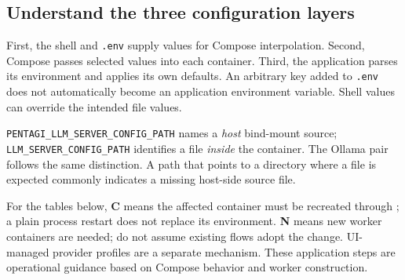 \documentclass[11pt,letterpaper]{article}
\newcommand{\code}[1]{\nolinkurl{#1}}
\newcommand{\src}[1]{\cite{#1}}
\begin{document}
\subsection{Understand the three configuration layers}
First, the shell and \code{.env} supply values for Compose interpolation.
Second, Compose passes selected values into each container. Third, the
application parses its environment and applies its own defaults. An arbitrary
key added to \code{.env} does not automatically become an application
environment variable. Shell values can override the intended file values.
\src{interpolation,precedence}

\code{PENTAGI_LLM_SERVER_CONFIG_PATH} names a \emph{host} bind-mount source;
\code{LLM_SERVER_CONFIG_PATH} identifies a file \emph{inside} the container.
The Ollama pair follows the same distinction. A path that points to a directory
where a file is expected commonly indicates a missing host-side source file.
\src{compose}

For the tables below, \textbf{C} means the affected container must be recreated
through \texttt{}; a plain process restart does not replace its environment.
\textbf{N} means new worker containers are needed; do not assume existing flows
adopt the change. UI-managed provider profiles are a separate mechanism.
These application steps are operational guidance based on Compose behavior
and worker construction. \src{compose-up,docker-code}
\end{document}
